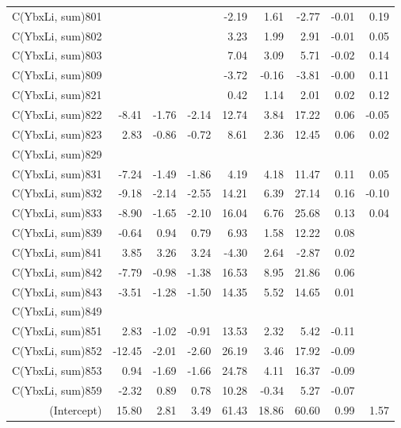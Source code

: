 \begin{table}[p]
\begin{tabular}{rrrrrrrrr}
  C(YbxLi, sum)801 &  &  &  & -2.19 & 1.61 & -2.77 & -0.01 & 0.19 \\ 
  C(YbxLi, sum)802 &  &  &  & 3.23 & 1.99 & 2.91 & -0.01 & 0.05 \\ 
  C(YbxLi, sum)803 &  &  &  & 7.04 & 3.09 & 5.71 & -0.02 & 0.14 \\ 
  C(YbxLi, sum)809 &  &  &  & -3.72 & -0.16 & -3.81 & -0.00 & 0.11 \\ 
  C(YbxLi, sum)821 &  &  &  & 0.42 & 1.14 & 2.01 & 0.02 & 0.12 \\ 
  C(YbxLi, sum)822 & -8.41 & -1.76 & -2.14 & 12.74 & 3.84 & 17.22 & 0.06 & -0.05 \\ 
  C(YbxLi, sum)823 & 2.83 & -0.86 & -0.72 & 8.61 & 2.36 & 12.45 & 0.06 & 0.02 \\ 
  C(YbxLi, sum)829 &  &  &  &  &  &  &  &  \\ 
  C(YbxLi, sum)831 & -7.24 & -1.49 & -1.86 & 4.19 & 4.18 & 11.47 & 0.11 & 0.05 \\ 
  C(YbxLi, sum)832 & -9.18 & -2.14 & -2.55 & 14.21 & 6.39 & 27.14 & 0.16 & -0.10 \\ 
  C(YbxLi, sum)833 & -8.90 & -1.65 & -2.10 & 16.04 & 6.76 & 25.68 & 0.13 & 0.04 \\ 
  C(YbxLi, sum)839 & -0.64 & 0.94 & 0.79 & 6.93 & 1.58 & 12.22 & 0.08 &  \\ 
  C(YbxLi, sum)841 & 3.85 & 3.26 & 3.24 & -4.30 & 2.64 & -2.87 & 0.02 &  \\ 
  C(YbxLi, sum)842 & -7.79 & -0.98 & -1.38 & 16.53 & 8.95 & 21.86 & 0.06 &  \\ 
  C(YbxLi, sum)843 & -3.51 & -1.28 & -1.50 & 14.35 & 5.52 & 14.65 & 0.01 &  \\ 
  C(YbxLi, sum)849 &  &  &  &  &  &  &  &  \\ 
  C(YbxLi, sum)851 & 2.83 & -1.02 & -0.91 & 13.53 & 2.32 & 5.42 & -0.11 &  \\ 
  C(YbxLi, sum)852 & -12.45 & -2.01 & -2.60 & 26.19 & 3.46 & 17.92 & -0.09 &  \\ 
  C(YbxLi, sum)853 & 0.94 & -1.69 & -1.66 & 24.78 & 4.11 & 16.37 & -0.09 &  \\ 
  C(YbxLi, sum)859 & -2.32 & 0.89 & 0.78 & 10.28 & -0.34 & 5.27 & -0.07 &  \\ 
  (Intercept) & 15.80 & 2.81 & 3.49 & 61.43 & 18.86 & 60.60 & 0.99 & 1.57 \\ 
   \hline
\end{tabular}
\end{table}
